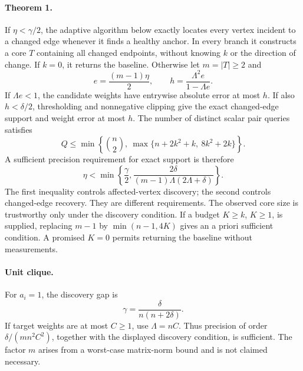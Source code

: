 \documentclass[11pt,letterpaper]{article}
\begin{document}
\paragraph{Theorem 1.} If $\eta<\gamma/2$, the adaptive algorithm below exactly locates every vertex incident to a changed edge whenever it finds a healthy anchor. In every branch it constructs a core $T$ containing all changed endpoints, without knowing $k$ or the direction of change. If $k=0$, it returns the baseline. Otherwise let $m=|T|\ge2$ and
\[
 e=\frac{(m-1)\eta}{2},\qquad
 h=\frac{\Lambda^2e}{1-\Lambda e}.
\]
If $\Lambda e<1$, the candidate weights have entrywise absolute error at most $h$. If also $h<\delta/2$, thresholding and nonnegative clipping give the exact changed-edge support and weight error at most $h$. The number of distinct scalar pair queries satisfies
\[
 Q\le\min\left\{\binom n2,\ \max\{n+2k^2+k,\ 8k^2+2k\}\right\}.
\]
A sufficient precision requirement for exact support is therefore
\[
 \eta<\min\left\{\frac\gamma2,
 \frac{2\delta}{(m-1)\Lambda(2\Lambda+\delta)}\right\}.
\]
The first inequality controls affected-vertex discovery; the second controls changed-edge recovery. They are different requirements. The observed core size is trustworthy only under the discovery condition. If a budget $K\ge k$, $K\ge1$, is supplied, replacing $m-1$ by $\min(n-1,4K)$ gives an a priori sufficient condition. A promised $K=0$ permits returning the baseline without measurements.

\paragraph{Unit clique.} For $a_i=1$, the discovery gap is
\[
 \gamma=\frac{\delta}{n(n+2\delta)}.
\]
If target weights are at most $C\ge1$, use $\Lambda=nC$. Thus precision of order $\delta/(mn^2C^2)$, together with the displayed discovery condition, is sufficient. The factor $m$ arises from a worst-case matrix-norm bound and is not claimed necessary.
\end{document}
